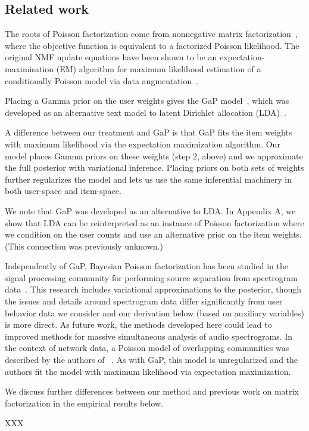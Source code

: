 \subsection{Related work}

The roots of Poisson factorization come from nonnegative matrix
factorization~\cite{Lee:1999}, where the objective function is
equivalent to a factorized Poisson likelihood.  The original NMF
update equations have been shown to be an expectation-maximisation
(EM) algorithm for maximum likelihood estimation of a conditionally
Poisson model via data augmentation~\cite{Cemgil:2009}.

Placing a Gamma prior on the user weights gives the GaP
model~\cite{Canny:2004}, which was developed as an alternative text
model to latent Dirichlet allocation (LDA)~\cite{Blei:2003b}.

A difference between our treatment and GaP is that GaP fits the item
weights with maximum likelihood via the expectation maximization
algorithm.  Our model places Gamma priors on these weights (step 2,
above) and we approximate the full posterior with variational
inference.  Placing priors on both sets of weights further regularizes
the model and lets us use the same inferential machinery in both
user-space and item-space.  


We note that GaP was developed as an alternative to LDA. In Appendix
A, we show that LDA can be reinterpreted as an instance of Poisson
factorization where we condition on the user counts and use an
alternative prior on the item weights.  (This connection was
previously unknown.)

Independently of GaP, Bayesian Poisson factorization has been studied
in the signal processing community for performing source separation
from spectrogram data~\cite{Cemgil:2009,Hoffman:2012}.  This research
includes variational approximations to the posterior, though the
issues and details around spectrogram data differ significantly from
user behavior data we consider and our derivation below (based on
auxiliary variables) is more direct.  As future work, the methods
developed here could lead to improved methods for massive simultaneous
analysis of audio spectrograms. In the context of network data, a
Poisson model of overlapping communities was described by the authors
of ~\cite{Ball:2011}. As with GaP, this model is unregularized and the
authors fit the model with maximum likelihood via expectation
maximization.

We discuss further differences between our method and previous work on
matrix factorization in the empirical results below.

XXX \cite{Marlin:2009,Marlin:2012,Elkan:2008}

